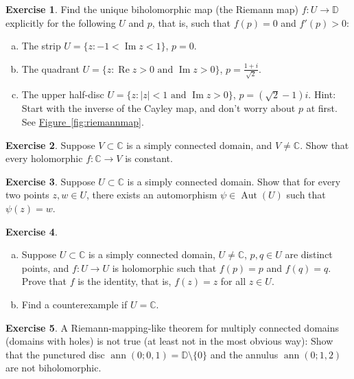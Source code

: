 \documentclass[12pt,openany]{book}
\newcommand{\ann}{\operatorname{ann}}
\renewcommand{\Re}{\operatorname{Re}}
\renewcommand{\Im}{\operatorname{Im}}
\newcommand{\Aut}{\operatorname{Aut}}
\newcommand{\sabs}[1]{\lvert {#1} \rvert}
\newcommand{\C}{{\mathbb{C}}}
\newcommand{\D}{{\mathbb{D}}}
\theoremstyle{plain}
\theoremstyle{remark}
\theoremstyle{definition}
\newenvironment{exbox}{%
    \def\FrameCommand{\vrule width 1pt \relax\hspace{10pt}}%
    \MakeFramed{\advance\hsize-\width\FrameRestore}%
}{%
    \endMakeFramed
}
\newenvironment{exparts}{%
    \leavevmode\begin{enumerate}[a),noitemsep,topsep=0pt,parsep=0pt,partopsep=0pt]
}{%
    \end{enumerate}
}
\theoremstyle{exercise}
\newtheorem{exercise}{Exercise}[section]
\theoremstyle{example}
\newcommand{\figureref}[1]{\hyperref[#1]{Figure~\ref*{#1}}}
\begin{document}
\begin{exbox}
\begin{exercise} \label{exercise:explicitriemann}
Find the unique biholomorphic map (the Riemann map)
$f \colon U \to \D$ explicitly
for the following $U$ and $p$, that is,
such that $f(p) = 0$ and $f'(p) > 0$:
\begin{exparts}
\item
The strip $U = \{ z : -1 < \Im z < 1 \}$, $p=0$.
\item
The quadrant $U = \{ z : \Re z > 0 \text{ and } \Im z > 0 \}$,
$p=\frac{1+i}{\sqrt{2}}$.
\item
The upper half-disc $U = \{ z : \sabs{z} < 1 \text{ and } \Im z > 0 \}$, $p
= (\sqrt{2}-1)i$.  Hint:  Start with the inverse of the Cayley map, and
don't worry about $p$ at first.  See \figureref{fig:riemannmap}.
\end{exparts}
\end{exercise}

\begin{exercise}
Suppose $V \subset \C$ is a simply connected domain, and $V \not= \C$.
Show that every holomorphic $f \colon \C \to V$ is constant.
\end{exercise}

\begin{exercise}
Suppose $U \subset \C$ is a simply connected domain.
Show that for every two points $z,w \in U$, there exists an automorphism
$\psi \in \Aut(U)$ such that $\psi(z) = w$.
\end{exercise}

\begin{exercise}
\begin{exparts}
\item
Suppose $U \subset \C$ is a simply connected domain, $U \not= \C$,
$p,q \in U$ are distinct points, and
$f \colon U \to U$ is holomorphic such that $f(p) = p$ and $f(q)=q$.
Prove that $f$ is the identity, that is, $f(z)=z$ for all $z \in U$.
\item
Find a counterexample if $U=\C$.
\end{exparts}
\end{exercise}

\begin{exercise}
A Riemann-mapping-like theorem for multiply connected domains (domains with
holes) is not true
(at least not in the most obvious way):
Show that the punctured disc $\ann(0;0,1) = \D \setminus \{ 0 \}$
and the annulus $\ann(0;1,2)$ are not biholomorphic.
\end{exercise}


\end{exbox}
\end{document}
